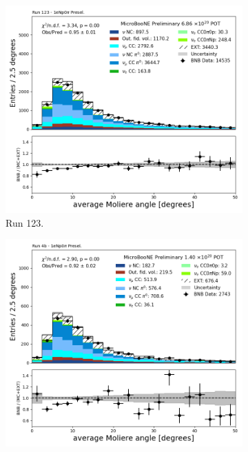 \begin{figure}[H]
    \centering
    \begin{subfigure}[t]{0.32\linewidth}
        \includegraphics[width=\linewidth]{technote/Appendix_Preselection/Figures/1eNp0pi/Run123/shrmoliereavg_Run123_1eNp0pi_Presel.png}
        \caption{Run 123.}
    \end{subfigure}%
    \hspace{0.2cm}%
    \begin{subfigure}[t]{0.32\linewidth}
        \includegraphics[width=\linewidth]{technote/Appendix_Preselection/Figures/1eNp0pi/Run4b/shrmoliereavg_Run4b_1eNp0pi_Presel.png}

\end{subfigure}
\end{figure}
